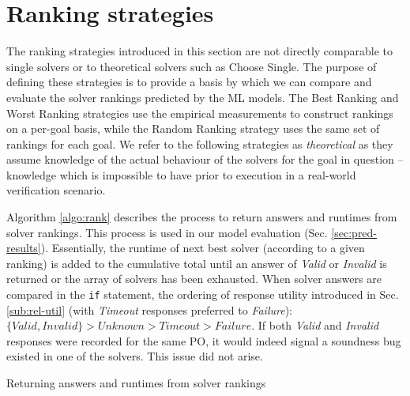 \section{Ranking strategies}
\label{sec:strategies}

The ranking strategies introduced in this section are not directly comparable to single solvers or to theoretical solvers such as \textsf{Choose Single}. 
The purpose of defining these strategies is to provide a basis by which we can compare and evaluate the solver rankings predicted by the ML models.
The \textsf{Best Ranking} and \textsf{Worst Ranking} strategies use the empirical measurements to construct rankings on a per-goal basis, while the \textsf{Random Ranking} strategy uses the same set of rankings for each goal.
We refer to the following strategies as \textit{theoretical} as they assume knowledge of the actual behaviour of the solvers for the goal in question -- knowledge which is impossible to have prior to execution in a real-world verification scenario.     

Algorithm \ref{algo:rank} describes the process to return answers and runtimes from solver rankings. This process is used in our model evaluation (Sec. \ref{sec:pred-results}).
Essentially, the runtime of next best solver (according to a given ranking) is added to the cumulative total until an answer of \textit{Valid} or \textit{Invalid} is returned or the array of solvers has been exhausted. 
When solver answers are compared in the \texttt{if} statement, the ordering of response utility introduced in Sec. \ref{sub:rel-util} (with \textit{Timeout} responses preferred to \textit{Failure}): $\lbrace Valid, Invalid \rbrace > Unknown > Timeout > Failure$.
If both \textit{Valid} and \textit{Invalid} responses were recorded for the same PO, it would indeed signal a soundness bug existed in one of the solvers.
This issue did not arise.  

\begin{algorithm}
	\caption{Returning answers and runtimes from solver rankings}
	\label{algo:rank}
	
\end{algorithm}


